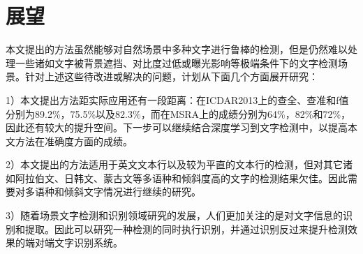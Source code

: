     \section{展望}
    
    本文提出的方法虽然能够对自然场景中多种文字进行鲁棒的检测，但是仍然难以处理一些诸如文字被背景遮挡、对比度过低或曝光影响等极端条件下的文字检测场景。针对上述这些待改进或解决的问题，计划从下面几个方面展开研究：
    
    1）本文提出方法距实际应用还有一段距离：在ICDAR2013上的查全、查准和f值分别为89.2\%，75.5\%以及82.3\%，而在MSRA上的成绩分别为64\%，82\%和72\%，因此还有较大的提升空间。下一步可以继续结合深度学习到文字检测中，以提高本文方法在准确度方面的成绩。
    
    2）本文提出的方法适用于英文文本行以及较为平直的文本行的检测，但对其它诸如阿拉伯文、日韩文、蒙古文等多语种和倾斜度高的文字的检测结果欠佳。因此需要对多语种和倾斜文字情况进行继续的研究。
    
    3）随着场景文字检测和识别领域研究的发展，人们更加关注的是对文字信息的识别和提取。因此可以研究一种检测的同时执行识别，并通过识别反过来提升检测效果的端对端文字识别系统。

